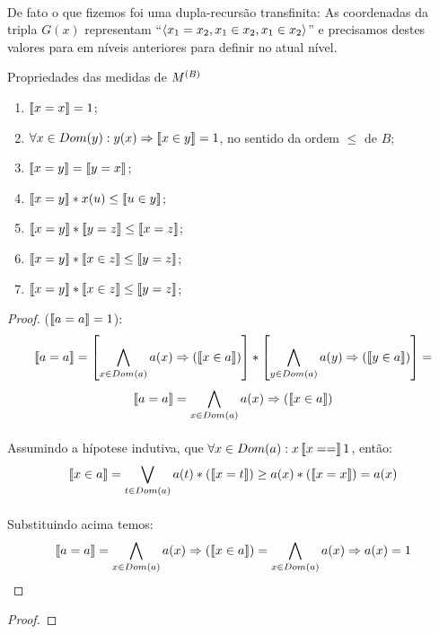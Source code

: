     \paragraph{}
        De fato o que fizemos foi uma dupla-recursão transfinita: As coordenadas da tripla $G(x)$ representam 
        ``$\TUPLE{x_1 = x_2}{x_1 \in x_2}{x_1 \in x_2}$'' e precisamos destes valores para em níveis anteriores 
        para definir no atual nível.
    \begin{proposition}{Propriedades das medidas de $M^{(B)}$}
        \begin{enumerate}
            \item $ \left\llbracket x = x\right\rrbracket = 1$;
            \item $ \forall x\in Dom(y): y(x) \Rightarrow \left\llbracket x \in y\right\rrbracket = 1$, no sentido da ordem $\leq$ de $B$;
            \item $ \left\llbracket x = y\right\rrbracket = \left\llbracket y = x\right\rrbracket$;
            \item $\left\llbracket x = y\right\rrbracket *  x(u)      \leq \left\llbracket u \in y\right\rrbracket$;
            \item $\left\llbracket x = y\right\rrbracket * \left\llbracket y = z\right\rrbracket \leq \left\llbracket x = z\right\rrbracket$;
            \item $\left\llbracket x = y\right\rrbracket * \left\llbracket x \in z\right\rrbracket \leq \left\llbracket y = z\right\rrbracket$;
            \item $\left\llbracket x = y\right\rrbracket * \left\llbracket x \in z\right\rrbracket \leq \left\llbracket y = z\right\rrbracket$;
        \end{enumerate}
        \begin{proof}

            ($\left\llbracket a = a\right\rrbracket = 1$):
            $$\left\llbracket a = a\right\rrbracket = \left[\bigwedge_{x\in Dom(a)} a(x)\Rightarrow (\left\llbracket x \in a\right\rrbracket)\right]*
                           \left[\bigwedge_{y\in Dom(a)} a(y)\Rightarrow (\left\llbracket y \in a\right\rrbracket)\right] = $$
            $$\left\llbracket a = a\right\rrbracket =       \bigwedge_{x\in Dom(a)} a(x)\Rightarrow (\left\llbracket x \in a\right\rrbracket)$$
            \paragraph{}
                Assumindo a hípotese indutiva, que $\forall x\in Dom(a):x\left\llbracket x = =\right\rrbracket 1$, então:
            $$\left\llbracket x \in a\right\rrbracket =       \bigvee_{  t\in Dom(a)} a(t)*    (\left\llbracket x = t\right\rrbracket) \geq a(x)*(\left\llbracket x = x\right\rrbracket) = a(x)$$
            \paragraph{}
                Substituindo acima temos:
            $$\left\llbracket a = a\right\rrbracket =       \bigwedge_{x\in Dom(a)} a(x)\Rightarrow (\left\llbracket x \in a\right\rrbracket) = \bigwedge_{x\in Dom(a)}a(x)\Rightarrow a(x) = 1$$\eop
        \end{proof}
        \begin{proof}
            

\end{proof}
\end{proposition}
